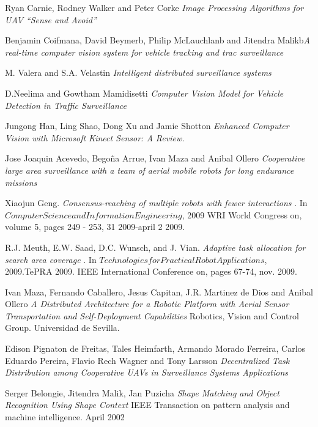 \documentclass[11pt, oneside]{book} %
\begin{document}
\begin{thebibliography}{9}

 Ryan Carnie, Rodney Walker and Peter Corke \textit{Image Processing Algorithms for UAV “Sense and Avoid”} 

 Benjamin Coifmana, David Beymerb, Philip McLauchlanb and Jitendra Malikb\textit{A real-time computer vision system for vehicle tracking and trac surveillance} 

 M. Valera and S.A. Velastin \textit{Intelligent distributed surveillance systems} 

 D.Neelima and Gowtham Mamidisetti \textit{Computer Vision Model for Vehicle Detection in Traffic Surveillance} 

 Jungong Han, Ling Shao, Dong Xu and Jamie Shotton \textit{Enhanced Computer Vision with Microsoft Kinect Sensor: A Review.} 

 Jose Joaquin Acevedo, Bego\~na Arrue, Ivan Maza and Anibal Ollero \textit{Cooperative large area surveillance with a team of aerial mobile robots for long endurance missions}


 Xiaojun Geng. \textit{ Consensus-reaching of multiple robots with fewer interactions }. In $Computer Science and Information Engineering$, 2009 WRI World Congress on, volume 5, pages 249 - 253, 31 2009-april 2 2009.

 R.J. Meuth, E.W. Saad, D.C. Wunsch, and J. Vian. \textit{Adaptive task allocation for search area coverage} . In $Technologies for Practical Robot Applications$, 2009.TePRA 2009. IEEE International Conference on, pages 67-74, nov. 2009.

 Ivan Maza, Fernando Caballero, Jesus Capitan, J.R. Martinez de Dios and Anibal Ollero \textit{A Distributed Architecture for a Robotic Platform with Aerial Sensor Transportation and Self-Deployment Capabilities} Robotics, Vision and Control Group. Universidad de Sevilla.

 Edison Pignaton de Freitas, Tales Heimfarth, Armando Morado Ferreira, Carlos Eduardo Pereira, Flavio Rech Wagner and Tony Larsson \textit{Decentralized Task Distribution among Cooperative UAVs in Surveillance Systems Applications}

 Serger Belongie, Jitendra Malik, Jan Puzicha \textit{Shape Matching and Object Recognition Using Shape Context} IEEE Transaction on pattern analysis and machine intelligence. April 2002
 

\end{thebibliography}
\end{document}
